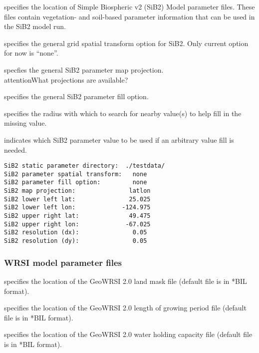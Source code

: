  
 
  specifies the location of 
 Simple Biospheric v2 (SiB2) Model parameter files.
 These files contain vegetation- and soil-based
 parameter information that can be used in the SiB2 model run.

  specifies the general grid
 spatial transform option for SiB2.  Only current option
 for now is ``none''.

  specfies the general SiB2 parameter
  map projection.  \\attention{What projections are available?}

  specifies the general SiB2
 parameter fill option.

  specifies the radius with which
 to search for nearby value(s) to help fill in the missing value.

  indicates which SiB2 parameter
 value to be used if an arbitrary value fill is needed. 

 

 \begin{Verbatim}[frame=single]
SiB2 static parameter directory:  ./testdata/
SiB2 parameter spatial transform:   none
SiB2 parameter fill option:         none
SiB2 map projection:               latlon
SiB2 lower left lat:               25.025
SiB2 lower left lon:             -124.975
SiB2 upper right lat:              49.475
SiB2 upper right lon:             -67.025
SiB2 resolution (dx):               0.05
SiB2 resolution (dy):               0.05
 \end{Verbatim}
 

 
 \subsubsection{WRSI model parameter files} 
  specifies the location of the GeoWRSI 2.0
   land mask file (default file is in *BIL format).

  specifies the 
   location of the GeoWRSI 2.0 length of growing period file
   (default file is in *BIL format).

  specifies the 
   location of the GeoWRSI 2.0 water holding capacity file
   (default file is in *BIL format).


